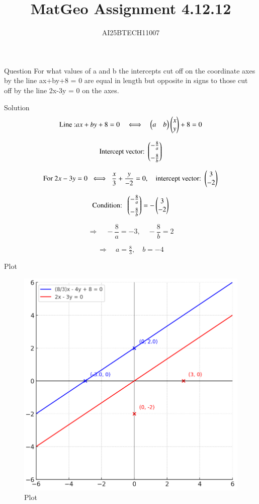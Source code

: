 \documentclass{beamer}
\title 
{MatGeo Assignment 4.12.12}
\author
{AI25BTECH11007}
\begin{document}
\frame{\titlepage}
\begin{frame}{Question}
For what values of a and b the intercepts cut off on the coordinate axes by the line ax+by+8 = 0 are equal in length but opposite in signs to those cut off by the line 2x-3y = 0 on the axes.
\end{frame}

\begin{frame}{Solution}
    \[
\text{Line :} ax+by+8=0 
\quad\Longleftrightarrow\quad 
\begin{pmatrix}a & b\end{pmatrix} \begin{pmatrix}x \\ y\end{pmatrix} + 8 = 0
\]
         
\[
\text{Intercept vector: }
\begin{pmatrix}-\tfrac{8}{a} \\[2mm] -\tfrac{8}{b}\end{pmatrix}
\]

\[
\text{For } 2x-3y=0 \;\;\Longleftrightarrow\;\; 
\frac{x}{3}+\frac{y}{-2}=0,
\quad
\text{intercept vector: }
\begin{pmatrix}3 \\ -2\end{pmatrix}
\]

\[
\text{Condition: }\;
\begin{pmatrix}-\tfrac{8}{a} \\[2mm] -\tfrac{8}{b}\end{pmatrix}
=
-\begin{pmatrix}3 \\ -2\end{pmatrix}
\]

\[
\Rightarrow\quad 
-\frac{8}{a} = -3, 
\quad 
-\frac{8}{b} = 2
\]

\[
\Rightarrow\quad 
a = \tfrac{8}{3}, 
\quad 
b = -4
\]

\end{frame}

\begin{frame}{Plot}
    \begin{figure}
        \centering
        \includegraphics[width=0.60\linewidth]{figs/image.png}
        \caption{Plot}
        \label{fig:placeholder}
    \end{figure}
\end{frame}
\end{document}
